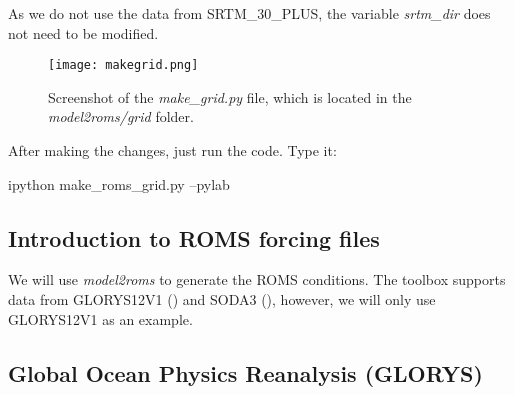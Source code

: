 \begin{tcolorbox}[enhanced,
    grow to left by   = 0cm,
    grow to right by  = 0cm,
    enlarge top by    = 0cm,
    enlarge bottom by = 0cm,
    tcbox raise base,
    boxrule           = 1.0pt,
    left              = 18mm,
    colframe          = red!50!black,coltext=red!25!black,colback=red!10!white,
    overlay           = {\begin{tcbclipinterior}\fill[red!75!blue!50!white] (frame.south west)
      rectangle node[text=white,font=\sffamily\bfseries\footnotesize,rotate=0] {WARNING} ([xshift=18mm]frame.north west);\end{tcbclipinterior}}]
As we do not use the data from SRTM\_30\_PLUS, the variable \textit{srtm\_dir} does not need to be modified.
\end{tcolorbox}
\bigskip

\begin{figure}[H]
    \centering
    \texttt{[image: makegrid.png]}
    \caption{Screenshot of the \textit{make\_grid.py} file, which is located in the \textit{model2roms/grid} folder.}
    \label{fazgrade}
\end{figure}
\bigskip

\noindent After making the changes, just run the code. Type it:
\bigskip

\begin{bashcode}
ipython make_roms_grid.py --pylab
\end{bashcode}
\bigskip

\subsection{Introduction to ROMS forcing files}
\bigskip

\noindent We will use \textit{model2roms} to generate the ROMS conditions. The toolbox supports data from GLORYS12V1 (\cite{Fernandez2018}) 
and SODA3 (\cite{Carton2018}), however, we will only use GLORYS12V1 as an example.

\subsection{Global Ocean Physics Reanalysis (GLORYS)}
\bigskip

